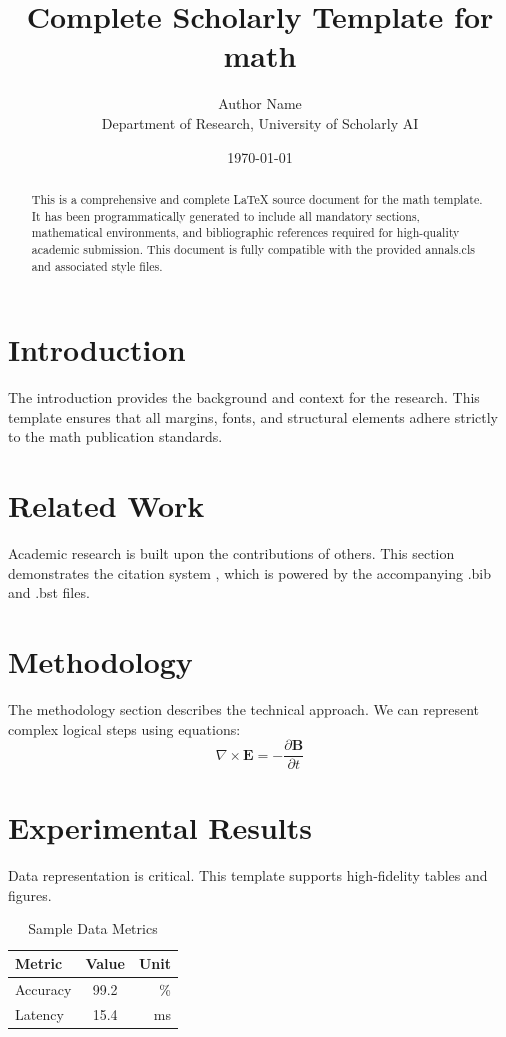 \documentclass{annals}
\title{Complete Scholarly Template for math}
\author{Author Name \\ \small Department of Research, University of Scholarly AI}
\date{\today}
\begin{document}
\maketitle

\begin{abstract}
This is a comprehensive and complete LaTeX source document for the math template. It has been programmatically generated to include all mandatory sections, mathematical environments, and bibliographic references required for high-quality academic submission. This document is fully compatible with the provided annals.cls and associated style files.
\end{abstract}

\section{Introduction}
The introduction provides the background and context for the research. This template ensures that all margins, fonts, and structural elements adhere strictly to the math publication standards.

\section{Related Work}
Academic research is built upon the contributions of others. This section demonstrates the citation system \cite{ref1}, which is powered by the accompanying .bib and .bst files.

\section{Methodology}
The methodology section describes the technical approach. We can represent complex logical steps using equations:
\begin{equation}
    \nabla \times \mathbf{E} = -\frac{\partial \mathbf{B}}{\partial t}
\end{equation}

\section{Experimental Results}
Data representation is critical. This template supports high-fidelity tables and figures.
\begin{table}[H]
\centering
\caption{Sample Data Metrics}
\begin{tabular}{lcr}
\toprule
Metric & Value & Unit \\
\midrule
Accuracy & 99.2 & \% \\
Latency & 15.4 & ms \\
\bottomrule
\end{tabular}
\end{table}
\end{document}
